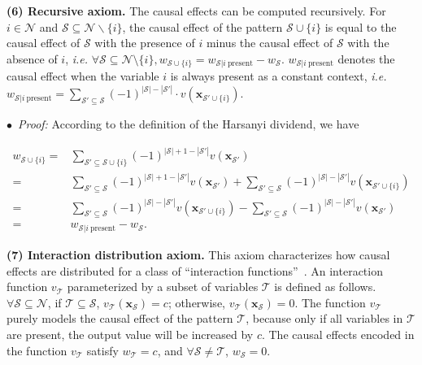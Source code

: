 \textbf{(6) Recursive axiom.} The causal effects can be computed recursively.
For {\small $i\in \mathcal{N}$} and {\small $\mathcal{S}\subseteq \mathcal{N}\backslash\{i\}$}, the causal effect of the pattern {\small $\mathcal{S}\cup\{i\}$} is equal to the causal effect of {\small $\mathcal{S}$} with the presence of $i$ minus the causal effect of $\mathcal{S}$ with the absence of $i$, \emph{i.e.} {\small $\forall \mathcal{S}\!\subseteq\! \mathcal{N}\!\setminus\!\{i\}, w_{\mathcal{S}\cup\{i\}} = w_{\mathcal{S}|i~\text{present}} - w_{\mathcal{S}}$}. {\small $w_{\mathcal{S}|i~\text{present}}$} denotes the causal effect when the variable $i$ is always present as a constant context, \emph{i.e.} {\small $
w_{\mathcal{S}|i~\text{present}}=\sum_{\mathcal{S}'\subseteq \mathcal{S}} (-1)^{|\mathcal{S}|-|\mathcal{S}'|}\cdot v(\boldsymbol{x}_{\mathcal{S}'\cup\{i\}})$}.

$\bullet$~\textit{Proof:} According to the definition of the Harsanyi dividend, we have


\begin{small}
\begin{align*}
w_{\mathcal{S}\cup\{i\}} =& \sum_{\mathcal{S}'\subseteq \mathcal{S}\cup\{i\}} (-1)^{|\mathcal{S}|+1-|\mathcal{S}'|}v(\boldsymbol{x}_{\mathcal{S}'})\\
=& \sum_{\mathcal{S}'\subseteq \mathcal{S}} (-1)^{|\mathcal{S}|+1-|\mathcal{S}'|}v(\boldsymbol{x}_{\mathcal{S}'}) + \sum_{\mathcal{S}'\subseteq \mathcal{S}} (-1)^{|\mathcal{S}|-|\mathcal{S}'|}v(\boldsymbol{x}_{\mathcal{S}'\cup\{i\}})\\
=& \sum_{\mathcal{S}'\subseteq \mathcal{S}} (-1)^{|\mathcal{S}|-|\mathcal{S}'|}v(\boldsymbol{x}_{\mathcal{S}'\cup\{i\}}) - \sum_{\mathcal{S}'\subseteq \mathcal{S}} (-1)^{|\mathcal{S}|-|\mathcal{S}'|}v(\boldsymbol{x}_{\mathcal{S}'})\\
=& w_{\mathcal{S}|i~\text{present}} - w_{\mathcal{S}}.
\end{align*}
\end{small}

\textbf{(7) Interaction distribution axiom.} This axiom characterizes how causal effects are distributed for a class of ``interaction functions''~\cite{sundararajan2020shapley}.
An interaction function {\small $v_{\mathcal{T}}$} parameterized by a subset of variables {\small $\mathcal{T}$} is defined as follows.
{\small $\forall \mathcal{S}\subseteq \mathcal{N}$}, if {\small $\mathcal{T}\subseteq \mathcal{S}$}, {\small$v_{\mathcal{T}}(\boldsymbol{x}_{\mathcal{S}})=c$}; otherwise, {\small $v_{\mathcal{T}}(\boldsymbol{x}_{\mathcal{S}})=0$}.
The function {\small$v_{\mathcal{T}}$} purely models the causal effect of the pattern {\small$\mathcal{T}$}, because only if all variables in {\small$\mathcal{T}$} are present, the output value will be increased by {\small$c$}.
The causal effects encoded in the function {\small$v_{\mathcal{T}}$} satisfy {\small $w_{\mathcal{T}}=c$}, and {\small $\forall \mathcal{S}\neq \mathcal{T}$}, {\small $w_{\mathcal{S}}=0$}.

